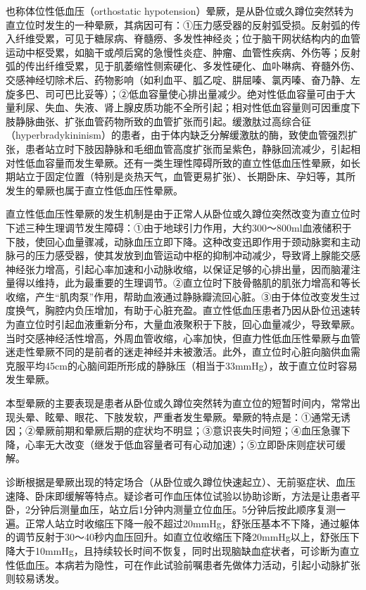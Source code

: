 也称体位性低血压（orthostatic
hypotension）晕厥，是从卧位或久蹲位突然转为直立位时发生的一种晕厥，其病因可有：①压力感受器的反射弧受损。反射弧的传入纤维受累，可见于糖尿病、脊髓痨、多发性神经炎；位于脑干网状结构内的血管运动中枢受累，如脑干或颅后窝的急慢性炎症、肿瘤、血管性疾病、外伤等；反射弧的传出纤维受累，见于肌萎缩性侧索硬化、多发性硬化、血卟啉病、脊髓外伤、交感神经切除术后、药物影响（如利血平、胍乙啶、肼屈嗪、氯丙嗪、奋乃静、左旋多巴、司可巴比妥等）；②低血容量使心排出量减少。绝对性低血容量可由于大量利尿、失血、失液、肾上腺皮质功能不全所引起；相对性低血容量则可因重度下肢静脉曲张、扩张血管药物所致的血管扩张而引起。缓激肽过高综合征（hyperbradykininism）的患者，由于体内缺乏分解缓激肽的酶，致使血管强烈扩张，患者站立时下肢因静脉和毛细血管高度扩张而呈紫色，静脉回流减少，引起相对性低血容量而发生晕厥。还有一类生理性障碍所致的直立性低血压性晕厥，如长期站立于固定位置（特别是炎热天气，血管更易扩张）、长期卧床、孕妇等，其所发生的晕厥也属于直立性低血压性晕厥。

直立性低血压性晕厥的发生机制是由于正常人从卧位或久蹲位突然改变为直立位时下述三种生理调节发生障碍：①由于地球引力作用，大约300～800ml血液储积于下肢，使回心血量骤减，动脉血压立即下降。这种改变迅即作用于颈动脉窦和主动脉弓的压力感受器，使其发放到血管运动中枢的抑制冲动减少，导致肾上腺能交感神经张力增高，引起心率加速和小动脉收缩，以保证足够的心排出量，因而脑灌注量得以维持，此为最重要的生理调节。②直立位时下肢骨骼肌的肌张力增高和等长收缩，产生“肌肉泵”作用，帮助血液通过静脉瓣流回心脏。③由于体位改变发生过度换气，胸腔内负压增加，有助于心脏充盈。直立性低血压患者乃因从卧位迅速转为直立位时引起血液重新分布，大量血液聚积于下肢，回心血量减少，导致晕厥。当时交感神经活性增高，外周血管收缩，心率加快，但直力性低血压性晕厥与血管迷走性晕厥不同的是前者的迷走神经并未被激活。此外，直立位时心脏向脑供血需克服平均45cm的心脑间距所形成的静脉压（相当于33mmHg），故于直立位时容易发生晕厥。

本型晕厥的主要表现是患者从卧位或久蹲位突然转为直立位的短暂时间内，常常出现头晕、眩晕、眼花、下肢发软，严重者发生晕厥。晕厥的特点是：①通常无诱因；②晕厥前期和晕厥后期的症状均不明显；③意识丧失时间短；④血压急骤下降，心率无大改变（继发于低血容量者可有心动加速）；⑤立即卧床则症状可缓解。

诊断根据是晕厥出现的特定场合（从卧位或久蹲位快速起立）、无前驱症状、血压速降、卧床即缓解等特点。疑诊者可作血压体位试验以协助诊断，方法是让患者平卧，2分钟后测量血压，站立后1分钟内测量立位血压。5分钟后按此顺序复测一遍。正常人站立时收缩压下降一般不超过20mmHg，舒张压基本不下降，通过躯体的调节反射于30～40秒内血压回升。如直立位收缩压下降20mmHg以上，舒张压下降大于10mmHg，且持续较长时间不恢复，同时出现脑缺血症状者，可诊断为直立性低血压。本病若为隐性，可在作此试验前嘱患者先做体力活动，引起小动脉扩张则较易诱发。

